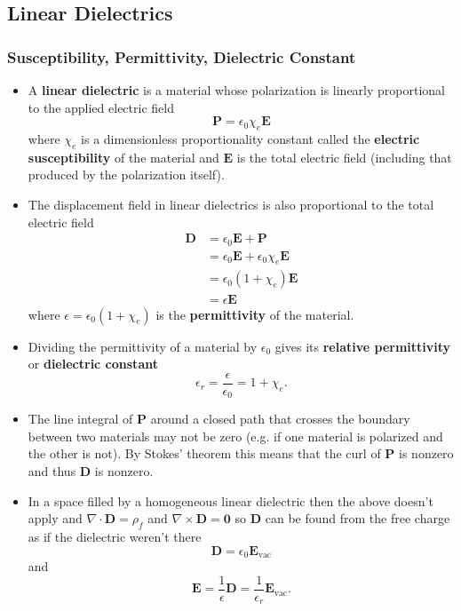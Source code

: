 \documentclass{article}
\renewcommand{\vec}[1]{\boldsymbol{\mathbf{#1}}}
\begin{document}
\subsection{Linear Dielectrics}

\subsubsection{Susceptibility, Permittivity, Dielectric Constant}

\begin{itemize}
  \item A \textbf{linear dielectric} is a material whose polarization is linearly proportional to the applied electric field \[\vec{P} = \epsilon_0 \chi_e \vec{E}\] where $\chi_e$ is a dimensionless proportionality constant called the \textbf{electric susceptibility} of the material and $\vec{E}$ is the total electric field (including that produced by the polarization itself).

  \item The displacement field in linear dielectrics is also proportional to the total electric field \begin{align*}
          \vec{D} & = \epsilon_0 \vec{E} + \vec{P}                   \\
                  & = \epsilon_0 \vec{E} + \epsilon_0 \chi_e \vec{E} \\
                  & = \epsilon_0 (1 + \chi_e) \vec{E}                \\
                  & = \epsilon \vec{E}
        \end{align*} where $\epsilon = \epsilon_0 (1 + \chi_e)$ is the \textbf{permittivity} of the material.

  \item Dividing the permittivity of a material by $\epsilon_0$ gives its \textbf{relative permittivity} or \textbf{dielectric constant} \[\epsilon_r = \frac{\epsilon}{\epsilon_0} = 1 + \chi_e.\]

  \item The line integral of $\vec{P}$ around a closed path that crosses the boundary between two materials may not be zero (e.g. if one material is polarized and the other is not). By Stokes' theorem this means that the curl of $\vec{P}$ is nonzero and thus $\vec{D}$ is nonzero.

  \item In a space filled by a homogeneous linear dielectric then the above doesn't apply and $\nabla \cdot \vec{D} = \rho_f$ and $\nabla \times \vec{D} = \vec{0}$ so $\vec{D}$ can be found from the free charge as if the dielectric weren't there \[\vec{D} = \epsilon_0 \vec{E}_\text{vac}\] and \[\vec{E} = \frac{1}{\epsilon} \vec{D} = \frac{1}{\epsilon_r} \vec{E}_\text{vac}.\]
\end{itemize}
\end{document}
